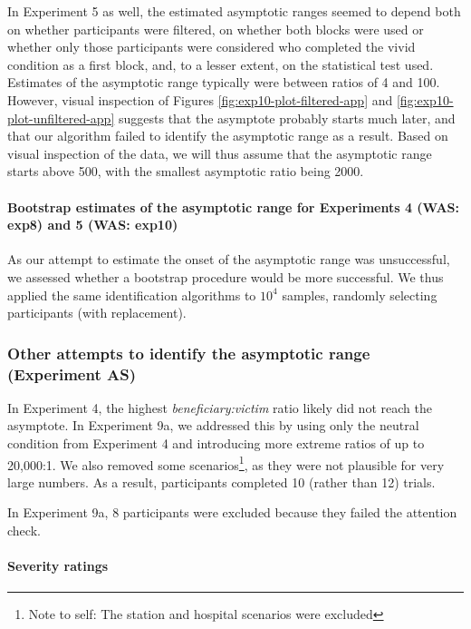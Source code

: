 \documentclass[
]{article}
\begin{document}
In Experiment 5 as well, the estimated asymptotic ranges seemed to depend both on whether participants were filtered, on whether both blocks were used or whether only those participants were considered who completed the vivid condition as a first block, and, to a lesser extent, on the statistical test used. Estimates of the asymptotic range typically were between ratios of 4 and 100. However, visual inspection of Figures \ref{fig:exp10-plot-filtered-app} and \ref{fig:exp10-plot-unfiltered-app} suggests that the asymptote probably starts much later, and that our algorithm failed to identify the asymptotic range as a result. Based on visual inspection of the data, we will thus assume that the asymptotic range starts above 500, with the smallest asymptotic ratio being 2000.

\paragraph{Bootstrap estimates of the asymptotic range for Experiments 4 (WAS: exp8) and 5 (WAS: exp10)}\label{bootstrap-estimates-of-the-asymptotic-range-for-experiments-4-was-exp8-and-5-was-exp10}

As our attempt to estimate the onset of the asymptotic range was unsuccessful, we assessed whether a bootstrap procedure would be more successful. We thus applied the same identification algorithms to \ensuremath{10^{4}} samples, randomly selecting participants (with replacement).

\clearpage

\subsubsection{Other attempts to identify the asymptotic range (Experiment AS)}\label{app:exp-AS}

In Experiment 4, the highest \emph{beneficiary:victim} ratio likely did not reach the asymptote. In Experiment 9a, we addressed this by using only the neutral condition from Experiment 4 and introducing more extreme ratios of up to 20,000:1. We also removed some scenarios\footnote{Note to self: The station and hospital scenarios were excluded}, as they were not plausible for very large numbers. As a result, participants completed 10 (rather than 12) trials.

In Experiment 9a, 8 participants were excluded because they failed the attention check.

\paragraph{Severity ratings}\label{severity-ratings-1}
\end{document}
